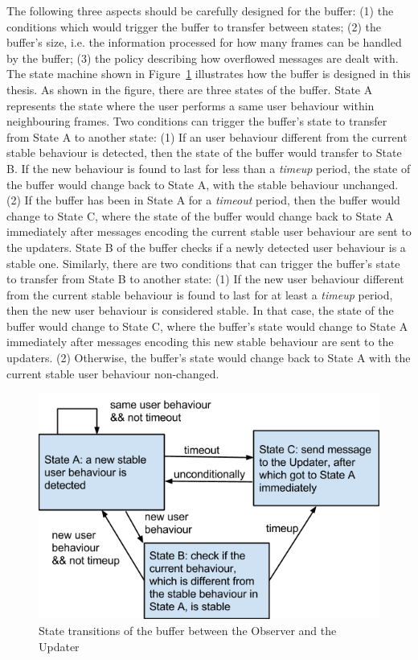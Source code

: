The following three aspects should be carefully designed for the buffer: (1) the conditions which would trigger the buffer to transfer between states; (2) the buffer's size, i.e. the information processed for how many frames can be handled by the buffer; (3) the policy describing how overflowed messages are dealt with. The state machine shown in Figure~\ref{fig:state-trans} illustrates how the buffer is designed in this thesis. As shown in the figure, there are three states of the buffer. State A represents the state where the user performs a same user behaviour within neighbouring frames. Two conditions can trigger the buffer's state to transfer from State A to another state: (1) If an user behaviour different from the current stable behaviour is detected, then the state of the buffer would transfer to State B. If the new behaviour is found to last for less than a \textit{timeup} period, the state of the buffer would change back to State A, with the stable behaviour unchanged. (2) If the buffer has been in State A for a \textit{timeout} period, then the buffer would change to State C, where the state of the buffer would change back to State A immediately after messages encoding the current stable user behaviour are sent to the updaters. State B of the buffer checks if a newly detected user behaviour is a stable one. Similarly, there are two conditions that can trigger the buffer's state to transfer from State B to another state: (1) If the new user behaviour different from the current stable behaviour is found to last for at least a \textit{timeup} period, then the new user behaviour is considered stable. In that case, the state of the buffer would change to State C, where the buffer's state would change to State A immediately after messages encoding this new stable behaviour are sent to the updaters. (2) Otherwise, the buffer's state would change back to State A with the current stable user behaviour non-changed.

\begin{figure}[h!]
\centering
\includegraphics[width=0.7\linewidth]{fig/state-trans.png}
\caption{State transitions of the buffer between the Observer and the Updater}
\label{fig:state-trans}
\end{figure}
 


